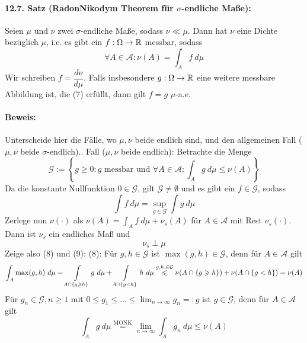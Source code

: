 \documentclass[11pt]{report}
\begin{document}
     \paragraph{12.7. Satz (Radon\textendash Nikodym Theorem f\"ur $\sigma$-endliche Ma\ss{}e):} Seien $\mu$ und $\nu$ zwei $\sigma$-endliche Ma\ss{}e, sodass $\nu\ll\mu$. Dann hat $\nu$ eine Dichte bez\"uglich $\mu$, i.e. es gibt ein $f:\Omega\to\mathbb{R}$ messbar, sodass
     \begin{equation}
         \forall A\in\mathcal{A}: \nu(A)=\int_A f \ d\mu
     \end{equation}
     Wir schreiben $f=\dfrac{d\nu}{d\mu}$. Falls insbesondere $g:\Omega\to\mathbb{R}$ eine weitere messbare Abbildung ist, die (7) erf\"ullt, dann gilt $f=g$ $\mu$-a.e.
     
     \paragraph{Beweis:} Unterscheide hier die F\"alle, wo $\mu,\nu$ beide endlich sind, und den allgemeinen Fall ($\mu,\nu$ beide $\sigma$-endlich).\newline{}. Fall ($\mu,\nu$ beide endlich): Betrachte die Menge
     $$\mathcal{G}:=\left\{g\geq0:g \text{ messbar und } \forall A\in\mathcal{A}:\int_A g\ d\mu\leq\nu(A)\right\}$$
     Da die konstante Nullfunktion $0\in\mathcal{G}$, gilt $\mathcal{G}\neq\emptyset$ und es gibt ein $f\in\mathcal{G}$, sodass
     \begin{equation}
         \int f\ d\mu=\sup_{g\in\mathcal{G}}\int g\ d\mu
     \end{equation}
     Zerlege nun $\nu(\cdot)$ als $\nu(A)=\displaystyle\int_A f\ d\mu+\nu_s(A)$ f\"ur $A\in\mathcal{A}$
     mit Rest $\nu_s(\cdot)$. Dann ist $\nu_s$ ein endliches Ma\ss{} und
     \begin{equation}
         \nu_s\perp\mu
     \end{equation}
     Zeige also (8) und (9):\newline
     (8): F\"ur $g,h\in\mathcal{G}$ ist $\max(g,h)\in\mathcal{G}$, denn f\"ur $A\in\mathcal{A}$ gilt
     $$\int_A \max(g,h)\ d\mu=\int\displaylimits_{A\cap\{g\geq h\}}g\ d\mu+\int\displaylimits_{A\cap\{g<h\}}h\ d\mu\overset{g,h,\in\mathcal{G}}{\leq}\nu(A\cap\{g\geq h\})+\nu(A\cap\{g<h\})=\nu(A)$$
     F\"ur $g_n\in\mathcal{G},n\geq1$ mit $0\leq g_1\leq\hdots\leq\lim_{n\to\infty}g_n=:g$ ist $g\in\mathcal{G}$, denn f\"ur $A\in\mathcal{A}$ gilt
     $$\int_A g \ d\mu\overset{\text{MONK}}{=}\lim_{n\to\infty}\int_A g_n\ d\mu\leq\nu(A)$$
\end{document}
